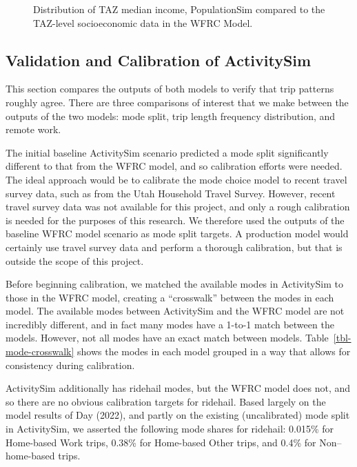 \documentclass[fancy, twoside, mastersfancy, ms]{byuthesis}
\begin{document}
\begin{figure}


\caption{\label{fig-median-income-density}Distribution of TAZ median
income, PopulationSim compared to the TAZ-level socioeconomic data in
the WFRC Model.}

\end{figure}%

\subsection{Validation and Calibration of
ActivitySim}\label{sec-baseline-calibration}

This section compares the outputs of both models to verify that trip
patterns roughly agree. There are three comparisons of interest that we
make between the outputs of the two models: mode split, trip length
frequency distribution, and remote work.

The initial baseline ActivitySim scenario predicted a mode split
significantly different to that from the WFRC model, and so calibration
efforts were needed. The ideal approach would be to calibrate the mode
choice model to recent travel survey data, such as from the Utah
Household Travel Survey. However, recent travel survey data was not
available for this project, and only a rough calibration is needed for
the purposes of this research. We therefore used the outputs of the
baseline WFRC model scenario as mode split targets. A production model
would certainly use travel survey data and perform a thorough
calibration, but that is outside the scope of this project.

Before beginning calibration, we matched the available modes in
ActivitySim to those in the WFRC model, creating a ``crosswalk'' between
the modes in each model. The available modes between ActivitySim and the
WFRC model are not incredibly different, and in fact many modes have a
1-to-1 match between the models. However, not all modes have an exact
match between models. Table~\ref{tbl-mode-crosswalk} shows the modes in
each model grouped in a way that allows for consistency during
calibration.

ActivitySim additionally has ridehail modes, but the WFRC model does
not, and so there are no obvious calibration targets for ridehail. Based
largely on the model results of Day (2022), and partly on the existing
(uncalibrated) mode split in ActivitySim, we asserted the following mode
shares for ridehail: 0.015\% for Home-based Work trips, 0.38\% for
Home-based Other trips, and 0.4\% for Non--home-based trips.
\end{document}
